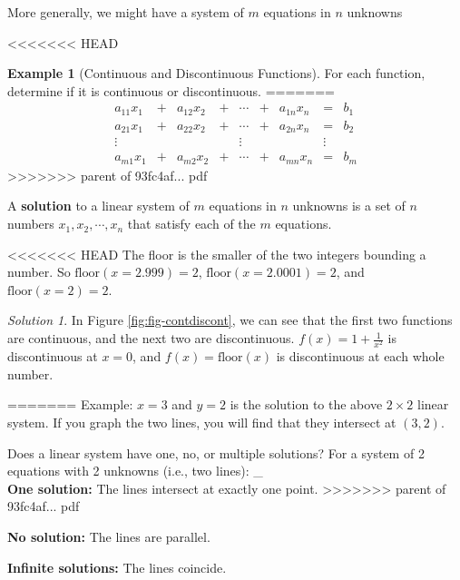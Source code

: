 \documentclass[]{book}
\theoremstyle{definition}
\theoremstyle{definition}
\newtheorem{example}{Example}[chapter]
\theoremstyle{definition}
\theoremstyle{remark}
\newtheorem*{solution}{Solution}
\begin{document}
More generally, we might have a system of \(m\) equations in \(n\) unknowns

<<<<<<< HEAD
\begin{example}[Continuous and Discontinuous Functions]
\protect\hypertarget{exm:contdiscont}{}{\label{exm:contdiscont} {} }
For each function, determine if it is continuous or discontinuous.
=======
\[\begin{matrix}
            a_{11}x_1  & + & a_{12}x_2 & + & \cdots & + & a_{1n}x_n & = & b_1\\
            a_{21}x_1  & + & a_{22}x_2 & + & \cdots & + & a_{2n}x_n & = & b_2\\
            \vdots     &   &     &   & \vdots &   &     & \vdots & \\
            a_{m1}x_1  & + & a_{m2}x_2 & + & \cdots & + & a_{mn}x_n & = & b_m
            \end{matrix}\]
>>>>>>> parent of 93fc4af... pdf

A \textbf{solution} to a linear system of \(m\) equations in \(n\) unknowns is a set of \(n\) numbers \(x_1, x_2, \cdots, x_n\) that satisfy each of the \(m\) equations.

<<<<<<< HEAD
The floor is the smaller of the two integers bounding a number. So \(\text{floor}(x = 2.999) = 2\), \(\text{floor}(x = 2.0001) = 2\), and \(\text{floor}(x = 2) = 2.\)
\end{example}

\begin{solution}
{}In Figure \ref{fig:fig-contdiscont}, we can see that the first two functions are continuous, and the next two are discontinuous. \(f(x) = 1 + \frac{1}{x^2}\) is discontinuous at \(x= 0\), and \(f(x) = \text{floor}(x)\) is discontinuous at each whole number.
\end{solution}
=======
Example: \(x=3\) and \(y=2\) is the solution to the above \(2\times 2\) linear system. If you graph the two lines, you will find that they intersect at \((3,2)\).

Does a linear system have one, no, or multiple solutions? For a system of 2 equations with 2 unknowns (i.e., two lines):
\_\\
\textbf{One solution:} The lines intersect at exactly one point.
>>>>>>> parent of 93fc4af... pdf

\textbf{No solution:} The lines are parallel.

\textbf{Infinite solutions:} The lines coincide.
\end{document}
